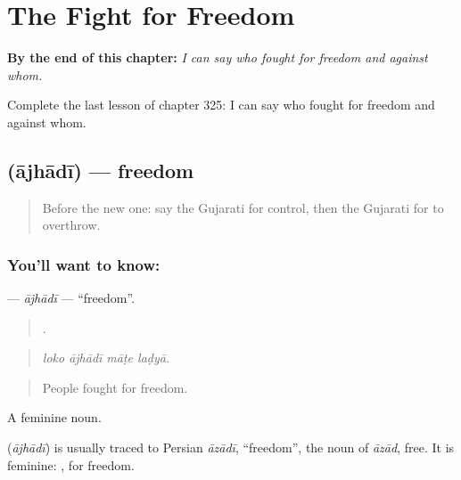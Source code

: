 
\chapter{The Fight for Freedom}
\label{ch:gu-the-fight-for-freedom}

\begin{chapteropening}
\textbf{By the end of this chapter:} \emph{I can say who fought for freedom and against whom.}

Complete the last lesson of chapter 325: I can say who fought for freedom and against whom.
\end{chapteropening}

\section[\texorpdfstring{\gu{આઝાદી} (ājhādī)}{આઝાદી (ājhādī)}]{ (ājhādī) — freedom}

\label{lesson:GU-C325-ajhadi}



\begin{quote}
Before the new one: say the Gujarati for control, then the Gujarati for to overthrow.
\end{quote}

\subsection*{You'll want to know: }
\textbf{} — \emph{ājhādī} — \textquotedblleft{}freedom\textquotedblright{}.

\begin{quote}
   .
\end{quote}

\begin{quote}
\emph{loko ājhādī māṭe laḍyā.}
\end{quote}

\begin{quote}
People fought for freedom.
\end{quote}

A feminine noun.

\begin{cousinweb}
\textbf{} (\emph{ājhādī}) is usually traced to Persian \emph{āzādī}, \textquotedblleft{}freedom\textquotedblright{}, the noun of \emph{āzād}, free. It is feminine: \textbf{ }, for freedom.
\end{cousinweb}


